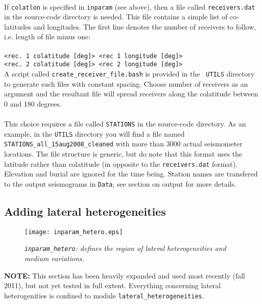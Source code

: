 \documentclass[11pt,letter,fleqn,english,notitlepage]{article}
\begin{document}
\\
If {\tt colatlon} is specified in {\tt inparam} (see above), then a file called
{\tt receivers.dat} in the source-code directory is needed. This file contains
a simple list of co-latitudes and longitudes.  The first line denotes the
number of receivers to follow, i.e. length of file minus one:\\ 
{\tt <number of receivers>\\
<rec. 1 colatitude [deg]> <rec 1 longitude [deg]>\\
<rec. 2 colatitude [deg]> <rec 2 longitude [deg]>}\\

\noindent 
A script called {\tt create\_receiver\_file.bash} is provided in the {\tt
UTILS} directory to generate such files with constant spacing. Choose number of
receivers as an argument and the resultant file will spread receivers along the
colatitude between 0 and 180 degrees.\\

\\
This choice requires a file called {\tt STATIONS} in the source-code directory.
As an example, in the {\tt UTILS} directory you will find a file named {\tt
STATIONS\_all\_15aug2008\_cleaned} with more than 3000 actual seismometer
locations.  The file structure is generic, but do note that this format uses
the latitude rather than colatitude (in opposite to the {\tt receivers.dat}
format).  Elevation and burial are ignored for the time being. Station names
are transfered to the output seismograms in {\tt Data}, see section on output
for more details.

\subsection{Adding lateral heterogeneities}
\begin{figure*}[htb]
    \begin{center}
        \texttt{[image: inparam\_hetero.eps]}
        \caption{\textit{{\tt inparam\_hetero}: defines the region of lateral
            heterogeneities and medium variations.}}
    \end{center}
\end{figure*}
\noindent 

\textbf{NOTE:} This section has been heavily expanded and used most recently
(fall 2011), but not yet tested in full extent. Everything concerning lateral
heterogenities is confined to module {\tt lateral\_heterogeneities}.\\
\end{document}
